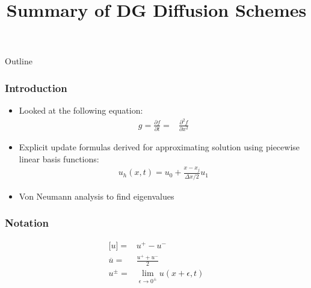 \documentclass[serif,12pt]{beamer}
\title{Summary of DG Diffusion Schemes}
\begin{document}
\begin{frame}
  \titlepage
\end{frame}

\begin{frame}{Outline}
  \tableofcontents
\end{frame}

\begin{frame}
\frametitle{Introduction}
	\begin{itemize}
		\item Looked at the following equation:
			\begin{align*}
				g = \frac{\partial f}{\partial t}=& \frac{\partial^2 f}{\partial x^2}
			\end{align*}
		\item Explicit update formulas derived for approximating solution using piecewise linear basis functions:
		\begin{align*}
			u_h(x,t) = u_0 + \frac{x-x_j}{\Delta x / 2} u_1
		\end{align*}
		\item Von Neumann analysis to find eigenvalues
	\end{itemize}
\end{frame}

\begin{frame}
\frametitle{Notation}
\begin{align*}
\lbrack u \rbrack = & u^+ - u^-\\
\overline{u} = & \frac{u^+ + u^-}{2}\\
u^{\pm} = & \lim_{\epsilon \to 0^\pm} u(x+\epsilon,t)
\end{align*}
\end{frame}
\end{document}
